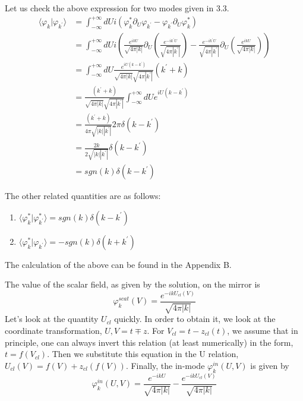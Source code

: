 Let us check the above expression for two modes given in 3.3. 
\begin{align*}
\langle\varphi_{k}|\varphi_{k^{\prime}}\rangle &= \int_{-\infty}^{+\infty}dUi(\varphi_{k}^{*}\partial_{U}\varphi_{k^{\prime}}-\varphi_{k^{\prime}}\partial_{U}\varphi_{k}^{*}) \\
&= \int_{-\infty}^{+\infty}dUi\left(\frac{e^{ikU}}{\sqrt{4\pi|k|}}\partial_{U}\left(\frac{e^{-ik^{\prime}U}}{\sqrt{4\pi|k^{\prime}|}}\right)-\frac{e^{-ik^{\prime}U}}{\sqrt{4\pi|k^{\prime}|}}\partial_{U}\left(\frac{e^{ikU}}{\sqrt{4\pi|k|}}\right)\right) \\
&= \int_{-\infty}^{+\infty}dU\frac{e^{iU(k-k^{\prime})}}{\sqrt{4\pi|k|}\sqrt{4\pi|k^{\prime}|}}(k^{\prime}+k) \\
&= \frac{(k^{\prime}+k)}{\sqrt{4\pi|k|}\sqrt{4\pi|k^{\prime}|}}\int_{-\infty}^{+\infty}dUe^{iU(k-k^{\prime})} \\
&= \frac{(k^{\prime}+k)}{4\pi\sqrt{|k||k^{\prime}|}}2\pi\delta(k-k^{\prime}) \\
&= \frac{2k}{2\sqrt{|k||k^{\prime}|}}\delta(k-k^{\prime}) \\
&= sgn(k)\delta(k-k^{\prime})
\end{align*}

The other related quantities are as follows: 
\begin{enumerate}
    \item $\langle\varphi_{k}^{*}|\varphi_{k^{\prime}}^{*}\rangle=sgn(k)\delta(k-k^{\prime})$ 
    \item $\langle\varphi_{k}^{*}|\varphi_{k^{\prime}}\rangle=-sgn(k)\delta(k+k^{\prime})$ 
\end{enumerate}
The calculation of the above can be found in the Appendix B. 

The value of the scalar field, as given by the solution, on the mirror is 
\begin{equation}
\varphi_{k}^{scat}(V)=\frac{e^{-ikU_{cl}(V)}}{\sqrt{4\pi|k|}}
\end{equation}
Let's look at the quantity $U_{cl}$ quickly. In order to obtain it, we look at the coordinate transformation, $U,V=t\mp z$. For $V_{cl}=t-z_{cl}(t)$, we assume that in principle, one can always invert this relation (at least numerically) in the form, $t=f(V_{cl})$. Then we substitute this equation in the U relation, $U_{cl}(V)=f(V)+z_{cl}(f(V))$. 
Finally, the in-mode $\varphi_{k}^{in}(U,V)$ is given by 
\begin{equation}
\varphi_{k}^{in}(U,V)=\frac{e^{-ikU}}{\sqrt{4\pi|k|}}-\frac{e^{-ikU_{cl}(V)}}{\sqrt{4\pi|k|}}
\end{equation}


